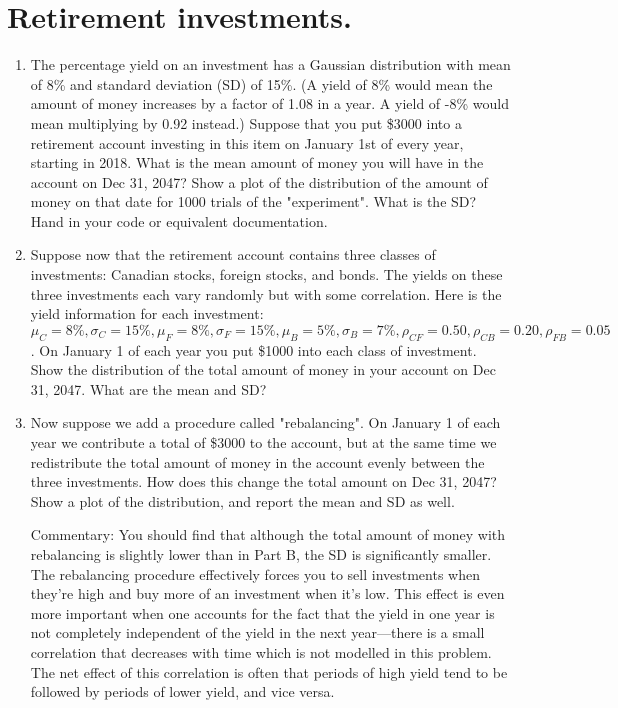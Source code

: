 \section{Retirement investments.}

\begin{enumerate}[label=\textbf{\Alph*}.]

    \item The percentage yield on an investment has a Gaussian distribution with mean of 8\% and standard deviation (SD) of 15\%. (A yield of 8\% would mean the amount of money increases by a factor of 1.08 in a year. A yield of -8\% would mean multiplying by 0.92 instead.) Suppose that you put \$3000 into a retirement account investing in this item on January 1st of every year, starting in 2018. What is the mean amount of money you will have in the account on Dec 31, 2047? Show a plot of the distribution of the amount of money on that date for 1000 trials of the "experiment". What is the SD? Hand in your code or equivalent documentation.


    \item Suppose now that the retirement account contains three classes of investments: Canadian stocks, foreign stocks, and bonds. The yields on these three investments each vary randomly but with some correlation. Here is the yield information for each investment: $\mu_C = 8\%, \sigma_C = 15\%, \mu_F = 8\%, \sigma_F = 15\%, \mu_B = 5\%, \sigma_B = 7\%, \rho_{CF}=0.50, \rho_{CB}=0.20, \rho_{FB}=0.05$. On January 1 of each year you put \$1000 into each class of investment. Show the distribution of the total amount of money in your account on Dec 31, 2047. What are the mean and SD?



    \item Now suppose we add a procedure called "rebalancing". On January 1 of each year we contribute a total of \$3000 to the account, but at the same time we redistribute the total amount of money in the account evenly between the three investments. How does this change the total amount on Dec 31, 2047? Show a plot of the distribution, and report the mean and SD as well.

    Commentary: You should find that although the total amount of money with rebalancing is slightly lower than in Part B, the SD is significantly smaller. The rebalancing procedure effectively forces you to sell investments when they're high and buy more of an investment when it's low. This effect is even more important when one accounts for the fact that the yield in one year is not completely independent of the yield in the next year---there is a small correlation that decreases with time which is not modelled in this problem. The net effect of this correlation is often that periods of high yield tend to be followed by periods of lower yield, and vice versa.


\end{enumerate}
